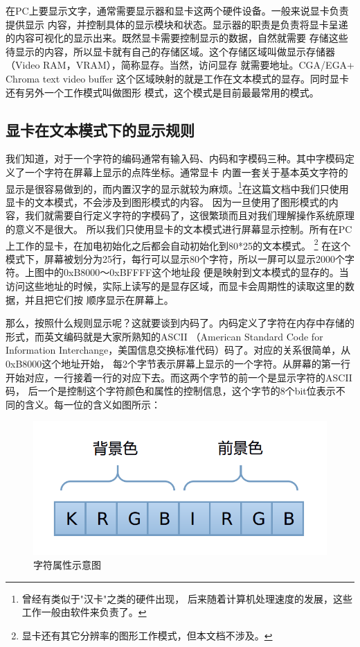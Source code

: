 \par 在PC上要显示文字，通常需要显示器和显卡这两个硬件设备。一般来说显卡负责提供显示\allowbreak
内容，并控制具体的显示模块和状态。显示器的职责是负责将显卡呈递的内容可视化的显示出来。既然显卡需要控制显示的数据，自然就需要\allowbreak
存储这些待显示的内容，所以显卡就有自己的存储区域。这个存储区域叫做显示存储器（Video RAM，VRAM），简称显存。当然，访问显存\allowbreak
就需要地址。CGA/EGA+ Chroma text video buffer 这个区域映射的就是工作在文本模式的显存。同时显卡还有另外一个工作模式叫做图形\allowbreak
模式，这个模式是目前最最常用的模式。

\subsection{显卡在文本模式下的显示规则}

\par 我们知道，对于一个字符的编码通常有输入码、内码和字模码三种。其中字模码定义了一个字符在屏幕上显示的点阵坐标。通常显卡\allowbreak
内置一套关于基本英文字符的显示是很容易做到的，而内置汉字的显示就较为麻烦。\footnote{曾经有类似于"汉卡"之类的硬件出现，\allowbreak
后来随着计算机处理速度的发展，这些工作一般由软件来负责了。}在这篇文档中我们只使用显卡的文本模式，不会涉及到图形模式的内容。\allowbreak
因为一旦使用了图形模式的内容，我们就需要自行定义字符的字模码了，这很繁琐而且对我们理解操作系统原理的意义不是很大。\allowbreak
所以我们只使用显卡的文本模式进行屏幕显示控制。所有在PC上工作的显卡，在加电初始化之后都会自动初始化到80*25的文本模式。\allowbreak
\footnote{显卡还有其它分辨率的图形工作模式，但本文档不涉及。}\allowbreak
在这个模式下，屏幕被划分为25行，每行可以显示80个字符，所以一屏可以显示2000个字符。上图中的0xB8000～0xBFFFF这个地址段\allowbreak
便是映射到文本模式的显存的。当访问这些地址的时候，实际上读写的是显存区域，而显卡会周期性的读取这里的数据，并且把它们按\allowbreak
顺序显示在屏幕上。

\par 那么，按照什么规则显示呢？这就要谈到内码了。内码定义了字符在内存中存储的形式，而英文编码就是大家所熟知的ASCII\allowbreak
（American Standard Code for Information Interchange，美国信息交换标准代码）码了。对应的关系很简单，从0xB8000这个地址开始，\allowbreak
每2个字节表示屏幕上显示的一个字符。从屏幕的第一行开始对应，一行接着一行的对应下去。而这两个字节的前一个是显示字符的ASCII码，\allowbreak
后一个是控制这个字符颜色和属性的控制信息，这个字节的8个bit位表示不同的含义。每一位的含义如图所示：

\begin{figure}[ht]
      \centering
      \includegraphics[scale=0.25]{picture/chapt4/char_color.png}
      \caption{字符属性示意图}
\end{figure}

